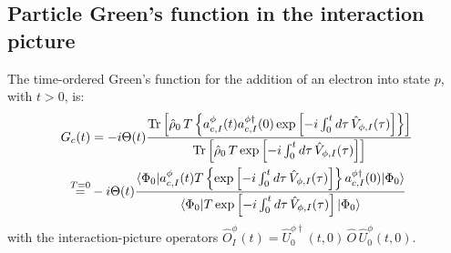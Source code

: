 \subsection{Particle Green's function in the interaction picture}
The time-ordered Green's function for the addition of an electron into state $p$, with $t>0$, is:
\begin{align}
    G_c(t)
    &=
    -i\Theta(t)
    \frac{
    \Tr\left[
    \hat\rho_0\,
    T\left\{
    a_{c,I}^\phi(t)
    a_{c,I}^{\phi\dagger}(0)
    \exp\left[
    -i\int_0^t d\tau\,
    \hat V_{\phi,I}(\tau)
    \right]
    \right\}
    \right]
    }{
    \Tr\left[
    \hat\rho_0\,
    T
    \exp\left[
    -i\int_0^t d\tau\,
    \hat V_{\phi,I}(\tau)
    \right]
    \right]
    }\\
\overset{T=0}{=}&
    -i\Theta(t)
    \frac{\langle\Phi_0|     a_{c,I}^\phi(t)
    T\left\{
    \exp\left[
    -i\int_0^t d\tau\,
    \hat V_{\phi,I}(\tau)
    \right]
    \right\}    a_{c,I}^{\phi\dagger}(0)|\Phi_0\rangle
    }{
    \langle\Phi_0|
    T
    \exp\left[
    -i\int_0^t d\tau\,
    \hat V_{\phi,I}(\tau)
    \right]
    |\Phi_0\rangle
    }
    \label{eq:fermionic_green_phi_trace}
\end{align}
with the interaction-picture operators $
    \hat O_I^\phi(t)
    =
    \hat U_0^{\phi\dagger}(t,0)\,
    \hat O\,
    \hat U_0^\phi(t,0).$

